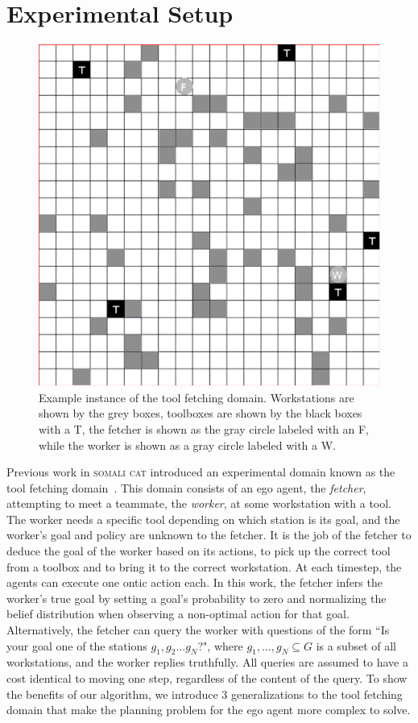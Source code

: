 \documentclass[letterpaper]{article}
\begin{document}
\section{Experimental Setup}
\begin{figure}
    \centering
    \includegraphics[width=0.6\linewidth]{Figures/ToolFetchingDomain_MultiTools_2.pdf}
    \caption{Example instance of the tool fetching domain. Workstations are shown by the grey boxes, toolboxes are shown by the black boxes with a T, the fetcher is shown as the gray circle labeled with an F, while the worker is shown as a gray circle labeled with a W.}
    \label{fig:domain_example}
\end{figure}

Previous work in \textsc{somali cat} introduced an experimental domain known as the tool fetching domain~\cite{mirskypenny}. This domain consists of an ego agent, the \emph{fetcher}, attempting to meet a teammate, the \emph{worker}, at some workstation with a tool. The worker needs a specific tool depending on which station is its goal, and the worker's goal and policy are unknown to the fetcher. It is the job of the fetcher to deduce the goal of the worker based on its actions, to pick up the correct tool from a toolbox and to bring it to the correct workstation. At each timestep, the agents can execute one ontic action each. In this work, the fetcher infers the worker's true goal by setting a goal's probability to zero and normalizing the belief distribution when observing a non-optimal action for that goal. Alternatively, the fetcher can query the worker with questions of the form ``Is your goal one of the stations $g_1,g_2...g_N$?", where $g_1, \ldots, g_N \subseteq G$ is a subset of all workstations, and the worker replies truthfully. All queries are assumed to have a cost identical to moving one step, regardless of the content of the query.
To show the benefits of our algorithm, we introduce 3 generalizations to the tool fetching domain that make the planning problem for the ego agent more complex to solve.
\end{document}
